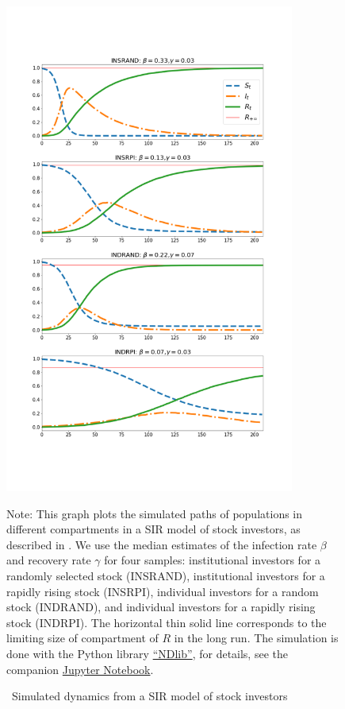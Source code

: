   \begin{figure} \centering  %
    \caption{ ~Simulated dynamics from a SIR model of stock investors}
    \label{fig:sir_simulate}
    \centerline{\includegraphics[width=0.85\textwidth,height=0.85\textheight]{./figures/sir_simulate}}
    \begin{flushleft}
      {\footnotesize Note: This graph plots the simulated paths of populations in different compartments in a SIR model of stock investors, as described in \cite{shiller1989survey}. We use the median estimates of the infection rate $\beta$ and recovery rate $\gamma$ for four samples: institutional investors for a randomly selected stock (INSRAND), institutional investors for a rapidly rising stock (INSRPI), individual investors for a random stock (INDRAND), and individual investors for a rapidly rising stock (INDRPI). The horizontal thin solid line corresponds to the limiting size of compartment of $R$ in the long run. The simulation is done with the Python library \href{https://ndlib.readthedocs.io/en/latest/}{``NDlib''}, for details, see the companion \href{https://github.com/llorracc/EpiExp/blob/master/SIR_Ndlib.ipynb}{Jupyter Notebook}. }
    \end{flushleft}
  \end{figure}
